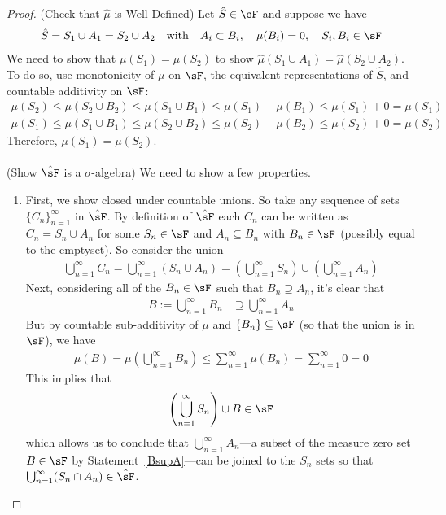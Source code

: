 \documentclass[12pt]{article}
\theoremstyle{plain}
\theoremstyle{definition}
\theoremstyle{remark}
\newcommand{\ninf}{_{n=1}^\infty}
\begin{document}
\begin{proof}
(Check that $\hat{\mu}$ is Well-Defined) Let $\hat{S}\in\sF$ and
suppose we have
\begin{align*}
    \hat{S} = S_1 \cup A_1 = S_2 \cup A_2
    \quad\text{with}\quad
    A_i \subset B_i, \quad \mu(B_i) = 0,
    \quad S_i, B_i \in \sF
\end{align*}
We need to show that $\mu(S_1) = \mu(S_2)$ to show $\hat{\mu}(S_1\cup
A_1) = \hat{\mu}(S_2\cup A_2)$. To do so, use monotonicity of $\mu$ on
$\sF$, the equivalent representations of $\hat{S}$, and
countable additivity on $\sF$:
\begin{align*}
  \mu(S_2) \leq \mu(S_2 \cup B_2) \leq
      \mu(S_1 \cup B_1) \leq \mu(S_1) + \mu(B_1)
      \leq \mu(S_1) + 0 = \mu(S_1)  \\
  \mu(S_1) \leq \mu(S_1 \cup B_1) \leq
      \mu(S_2 \cup B_2) \leq \mu(S_2) + \mu(B_2)
      \leq \mu(S_2) + 0 = \mu(S_2)
\end{align*}
Therefore, $\mu(S_1) = \mu(S_2)$.
\\
\\
(Show $\hat{\sF}$ is a $\sigma$-algebra) We need to show a few properties.
\begin{enumerate}
  \item
    First, we show closed under countable unions. So take any sequence
    of sets $\{C_n\}\ninf$ in $\hat{\sF}$. By definition of
    $\hat{\sF}$ each $C_n$ can be written as $C_n=S_n\cup A_n$ for some
    $S_n \in \sF$ and $A_n\subseteq B_n$ with $B_n\in\sF$ (possibly
    equal to the emptyset). So consider the union
    \begin{align*}
        \bigcup^\infty_{n=1} C_n=
        \bigcup^\infty_{n=1} (S_n\cup A_n) =
        \left(\bigcup^\infty_{n=1} S_n\right)
        \cup \left(\bigcup^\infty_{n=1} A_n\right)
    \end{align*}
    Next, considering all of the $B_n\in\sF$ such that $B_n\supseteq
    A_n$, it's clear that
    \begin{align}
        B:=\bigcup^\infty_{n=1} B_n &\supseteq
        \bigcup^\infty_{n=1} A_n
        \label{BsupA}
    \end{align}
    But by countable sub-additivity of $\mu$ and $\{B_n\}\subseteq\sF$
    (so that the union is in $\sF$), we have
    \begin{align}
        \mu(B)
        =\mu\left(\bigcup^\infty_{n=1} B_n \right)
        \leq\sum^\infty_{n=1} \mu\left(B_n \right)
        =\sum^\infty_{n=1} 0 =0
    \end{align}
    This implies that
    \begin{align*}
        \left(\bigcup^\infty_{n=1} S_n\right) \cup B \in
        {\sF}
    \end{align*}
    which allows us to conclude that $\bigcup\ninf A_n$---a subset of
    the measure zero set $B\in\sF$ by Statement~\ref{BsupA}---can be
    joined to the $S_n$ sets so that
    $\bigcup\ninf (S_n \cap A_n)\in\hat{\sF}$.


\end{enumerate}
\end{proof}
\end{document}
